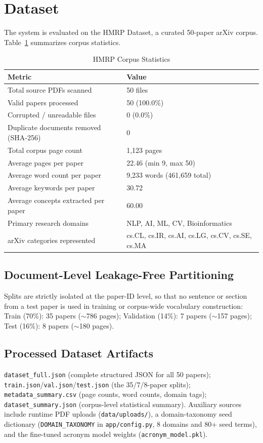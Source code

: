 \documentclass[10pt,conference]{IEEEtran}
\begin{document}
\section{Dataset}
\label{sec:dataset}
The system is evaluated on the HMRP Dataset, a curated 50-paper arXiv corpus. Table~\ref{tab:corpus} summarizes corpus statistics.

\begin{table}[t]
\caption{HMRP Corpus Statistics}
\label{tab:corpus}
\centering
\small
\begin{tabular}{@{}p{}p{}@{}}
\toprule
\textbf{Metric} & \textbf{Value} \\
\midrule
Total source PDFs scanned & 50 files \\
Valid papers processed & 50 (100.0\%) \\
Corrupted / unreadable files & 0 (0.0\%) \\
Duplicate documents removed (SHA-256) & 0 \\
Total corpus page count & 1{,}123 pages \\
Average pages per paper & 22.46 (min 9, max 50) \\
Average word count per paper & 9{,}233 words (461{,}659 total) \\
Average keywords per paper & 30.72 \\
Average concepts extracted per paper & 60.00 \\
Primary research domains & NLP, AI, ML, CV, Bioinformatics \\
arXiv categories represented & cs.CL, cs.IR, cs.AI, cs.LG, cs.CV, cs.SE, cs.MA \\
\bottomrule
\end{tabular}
\end{table}

\subsection{Document-Level Leakage-Free Partitioning}
Splits are strictly isolated at the paper-ID level, so that no sentence or section from a test paper is used in training or corpus-wide vocabulary construction: Train (70\%): 35 papers ($\sim$786 pages); Validation (14\%): 7 papers ($\sim$157 pages); Test (16\%): 8 papers ($\sim$180 pages).

\subsection{Processed Dataset Artifacts}
\texttt{dataset\_full.json} (complete structured JSON for all 50 papers); \texttt{train.json}/\texttt{val.json}/\texttt{test.json} (the 35/7/8-paper splits); \texttt{metadata\_summary.csv} (page counts, word counts, domain tags); \texttt{dataset\_summary.json} (corpus-level statistical summary). Auxiliary sources include runtime PDF uploads (\texttt{data/uploads/}), a domain-taxonomy seed dictionary (\texttt{DOMAIN\_TAXONOMY} in \texttt{app/config.py}, 8 domains and 80+ seed terms), and the fine-tuned acronym model weights (\texttt{acronym\_model.pkl}).
\end{document}
